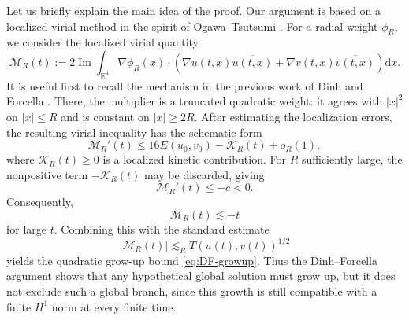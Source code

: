\documentclass[10pt,a4paper]{amsart}
\numberwithin{equation}{section}
\newcommand{\dd}{\mathrm{d}x}
\newcommand{\im}{\operatorname{Im}}
\begin{document}
Let us briefly explain the main idea of the proof. Our argument is based on a localized virial method in the spirit of Ogawa--Tsutsumi \cite{OT}. For a radial weight $\phi_R$, we consider the localized virial quantity
\begin{equation*}
\mathcal M_R(t):= 2\im\int_{\mathbb R^4} \nabla\phi_R(x)\cdot \left(\nabla u(t,x)\overline{u(t,x)}+\nabla v(t,x)\overline{v(t,x)}\right)\dd.
\end{equation*}
It is useful first to recall the mechanism in the previous work of Dinh and Forcella \cite{DF}. There, the multiplier is a truncated quadratic weight: it agrees with $|x|^2$ on $|x|\le R$ and is constant on $|x|\ge 2R$. After estimating the localization errors, the resulting virial inequality has the schematic form
\[
\mathcal M_R'(t) \le 16E(u_0,v_0)-\mathcal K_R(t)+o_R(1),
\]
where $\mathcal K_R(t)\ge0$ is a localized kinetic contribution. For $R$ sufficiently large, the nonpositive term $-\mathcal K_R(t)$ may be discarded, giving
\[
\mathcal M_R'(t)\le -c<0.
\]
Consequently,
\[
\mathcal M_R(t)\lesssim -t
\]
for large $t$. Combining this with the standard estimate
\[
|\mathcal M_R(t)|\lesssim_R T(u(t),v(t))^{1/2}
\]
yields the quadratic grow-up bound \eqref{eq:DF-growup}. Thus the Dinh--Forcella argument shows that any hypothetical global solution must grow up, but it does not exclude such a global branch, since this growth is still compatible with a finite $H^1$ norm at every finite time.
\end{document}
